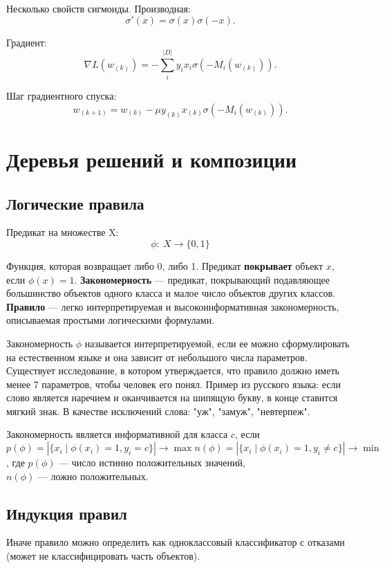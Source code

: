 Несколько свойств сигмоиды. Производная:
\[
    \sigma'(x) = \sigma(x) \sigma(-x).
\]

Градиент:
\[
    \nabla L(w_{(k)}) = - \sum^{|D|}_i y_i x_i \sigma(-M_i(w_{(k)})).
\]

Шаг градиентного спуска:
\[
    w_{(k+1)} = w_{(k)} - \mu y_{(k)} x_{(k)} \sigma(-M_i(w_{(k)})).
\]

\section{Деревья решений и композиции}

\subsection{Логические правила}

Предикат на множестве X:
\[
    \phi:\ X \to \{0, 1\}
\]

Функция, которая возвращает либо 0, либо 1. Предикат \textbf{покрывает} объект
$x$, если $\phi(x) = 1$. \textbf{Закономерность} --- предикат, покрывающий
подавляющее большинство объектов одного класса и малое число объектов других
классов. \textbf{Правило} --- легко интерпретируемая и высокоинформативная
закономерность, описываемая простыми логическими формулами.

Закономерность $\phi$ называется интерпретируемой, если ее можно сформулировать
на естественном языке и она зависит от небольшого числа параметров. Существует
исследование, в котором утверждается, что правило должно иметь менее 7
параметров, чтобы человек его понял.
Пример из русского языка: если слово является наречием и оканчивается на
шипящую букву, в конце ставится мягкий знак. В качестве исключений слова: "уж",
"замуж", "невтерпеж".

Закономерность является информативной для класса $c$, если
\[
    p(\phi) = |\{x_i \mid \phi(x_i) = 1, y_i = c\}| \to \max
    n(\phi) = |\{x_i \mid \phi(x_i) = 1, y_i \neq c\}| \to \min
\], где $p(\phi)$ --- число истинно положительных значений,\\
$n(\phi)$ --- ложно положительных.

\subsection{Индукция правил}

Иначе правило можно определить как одноклассовый классификатор с отказами
(может не классифицировать часть объектов).

